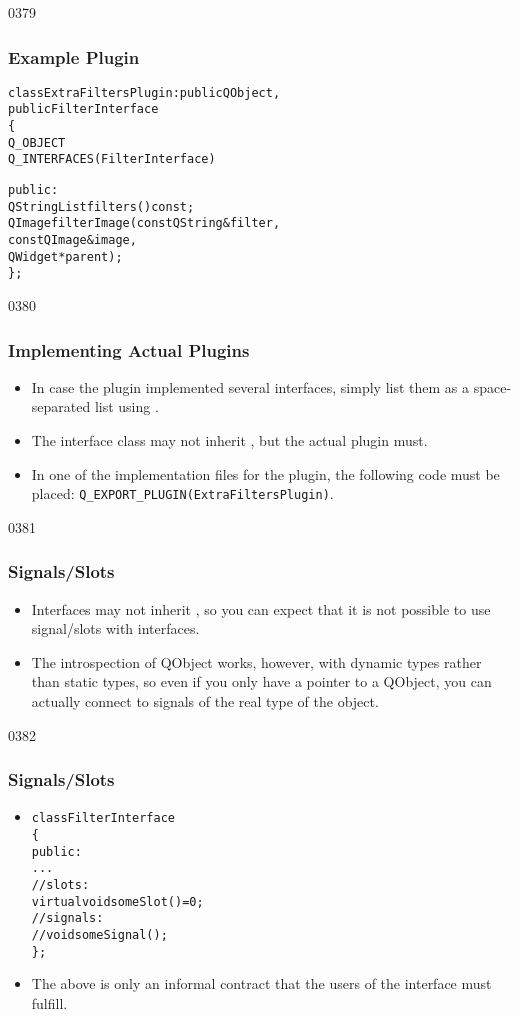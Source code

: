 \begin{slide}[fragile]{0379}
\frametitle{Example Plugin}
  \begin{alltt}\small
class ExtraFiltersPlugin : public QObject, 
                           public FilterInterface
\{
    Q_OBJECT
    Q_INTERFACES(FilterInterface)

public:
    QStringList filters() const;
    QImage filterImage(const QString &filter, 
                       const QImage &image,
                       QWidget *parent);
\};
  \end{alltt}
\end{slide}

\begin{slide}{0380}\frametitle{Implementing Actual Plugins}
\begin{itemize}
\item In case the plugin implemented several interfaces, simply list them as a
  space-separated list using .
\item The interface class may not inherit , but the actual
  plugin must.
\item In one of the implementation files for the plugin, the following code
  must be placed: \texttt{Q\_EXPORT\_PLUGIN(ExtraFiltersPlugin)}.
\end{itemize}
\end{slide}

\begin{slide}{0381}\frametitle{Signals/Slots}
\begin{itemize}
\item Interfaces may not inherit , so you can expect that
  it is not possible to use signal/slots with interfaces.
\item The introspection of QObject works, however, with dynamic types
  rather than static types, so even if you only have a pointer to a
  QObject, you can actually connect to signals of the real type of the object.
\end{itemize}
\end{slide}

\begin{slide}[fragile]{0382}
\frametitle{Signals/Slots}
\begin{itemize}
\item 
\begin{alltt}
class FilterInterface
\{
public:
     ...
    // slots:
    virtual void someSlot() = 0;
    // signals:
    // void someSignal();
\};
\end{alltt}
\item The above is only an informal contract that the users of the interface
  must fulfill.
\end{itemize}
\end{slide}


